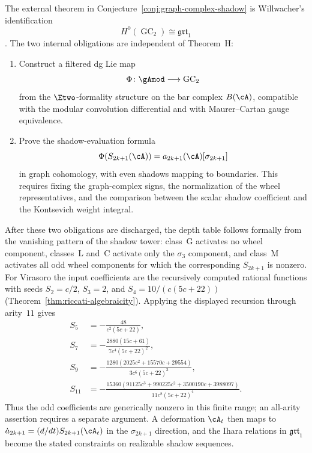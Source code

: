 \begin{remark}
The external theorem in
Conjecture~\ref{conj:graph-complex-shadow} is Willwacher's
identification
\[
H^0(\operatorname{GC}_2)\cong\mathfrak{grt}_1
\]
\cite{Willwacher15}. The two internal obligations are independent
of Theorem~H:
\begin{enumerate}[label=\textup{(\roman*)}]
\item Construct a filtered dg Lie map
\[
\Phi\colon \gAmod\longrightarrow\operatorname{GC}_2
\]
from the $\Etwo$-formality structure on the bar complex
$B(\cA)$, compatible with the modular convolution differential and
with Maurer--Cartan gauge equivalence.
\item Prove the shadow-evaluation formula
\[
\Phi(S_{2k+1}(\cA))
=a_{2k+1}(\cA)[\sigma_{2k+1}]
\]
in graph cohomology, with even shadows mapping to boundaries. This
requires fixing the graph-complex signs, the normalization of the
wheel representatives, and the comparison between the scalar
shadow coefficient and the Kontsevich weight integral.
\end{enumerate}
After these two obligations are discharged, the depth table follows
formally from the vanishing pattern of the shadow tower: class~G
activates no wheel component, classes~L and~C activate only the
$\sigma_3$ component, and class~M activates all odd wheel components
for which the corresponding $S_{2k+1}$ is nonzero. For Virasoro the
input coefficients are the recursively computed rational functions
with seeds
$S_2=c/2$, $S_3=2$, and $S_4=10/(c(5c+22))$
\textup{(}Theorem~\ref{thm:riccati-algebraicity}\textup{)}.  Applying
the displayed recursion through arity~$11$ gives
\begin{align*}
 S_5&=-\frac{48}{c^2(5c+22)},\\
 S_7&=-\frac{2880(15c+61)}{7c^4(5c+22)^2},\\
 S_9&=-\frac{1280(2025c^2+15570c+29554)}
 {3c^6(5c+22)^3},\\
 S_{11}&=-\frac{15360(91125c^3+990225c^2+3500190c+3988097)}
 {11c^8(5c+22)^4}.
\end{align*}
Thus the odd coefficients are generically nonzero in this finite
range; an all-arity assertion requires a separate argument. A deformation
$\cA_t$ then maps to
$\dot a_{2k+1}=(d/dt)S_{2k+1}(\cA_t)$ in the
$\sigma_{2k+1}$ direction, and the Ihara relations in
$\mathfrak{grt}_1$ become the stated constraints on realizable
shadow sequences.
\end{remark}

